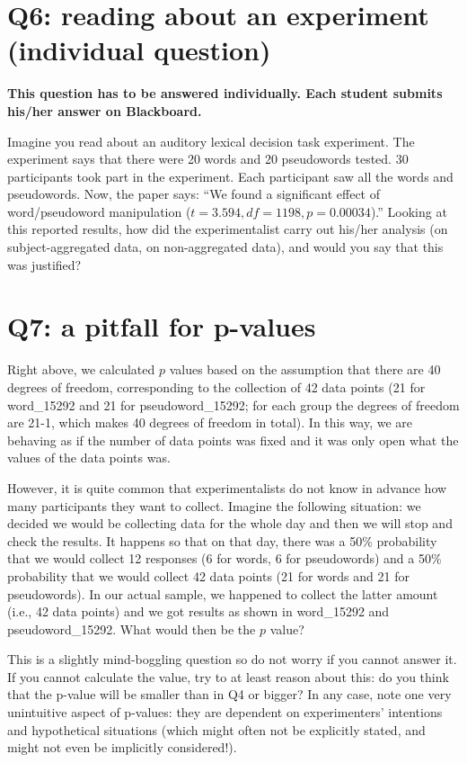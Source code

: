 \documentclass{article}\usepackage[]{graphicx}\usepackage[]{color}
\begin{document}
\section*{Q6: reading about an experiment (individual question)}

\textbf{This question has to be answered individually. Each student submits his/her answer on Blackboard.}

Imagine you read about an auditory lexical decision task experiment. The experiment says that there were 20 words and 20 pseudowords tested. 30 participants took part in the experiment. Each participant saw all the words and pseudowords. Now, the paper says: ``We found a significant effect of word/pseudoword manipulation ($t=3.594, df=1198, p=0.00034$).'' Looking at this reported results, how did the experimentalist carry out his/her analysis (on subject-aggregated data, on non-aggregated data), and would you say that this was justified?

\section*{Q7: a pitfall for p-values}

Right above, we calculated $p$ values based on the assumption that there are 40 degrees of freedom, corresponding to the collection of 42 data points (21 for word\_15292 and 21 for pseudoword\_15292; for each group the degrees of freedom are 21-1, which makes 40 degrees of freedom in total). In this way, we are behaving as if the number of data points was fixed and it was only open what the values of the data points was.

However, it is quite common that experimentalists do not know in advance how many participants they want to collect. 
Imagine the following situation: we decided we would be collecting data for the whole day and then we will stop and check the results. It happens so that on that day, there was a 50\% probability that we would collect 12 responses (6 for words, 6 for pseudowords) and a 50\% probability that we would collect 42 data points (21 for words and 21 for pseudowords). In our actual sample, we happened to collect the latter amount (i.e., 42 data points) and we got results as shown in word\_15292 and  pseudoword\_15292. What would then be the $p$ value?

This is a slightly mind-boggling question so do not worry if you cannot answer it. If you cannot calculate the value, try to at least reason about this: do you think that the p-value will be smaller than in Q4 or bigger? In any case, note one very unintuitive aspect of p-values: they are dependent on experimenters' intentions and hypothetical situations (which might often not be explicitly stated, and might not even be implicitly considered!).
\end{document}
